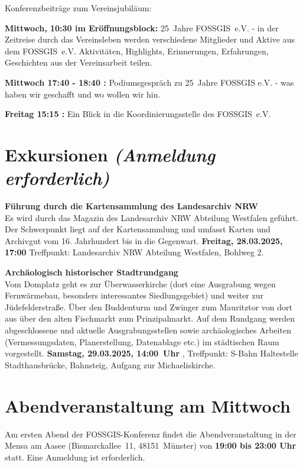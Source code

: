 \noindent
Konferenzbeiträge zum Vereinsjubiläum:
\begin{description}
\item{\bfseries Mittwoch, 10:30 im Eröffnungsblock:} 25~Jahre FOSSGIS~e.V. - in der Zeitreise durch das Vereinsleben werden verschiedene Mitglieder und Aktive aus dem FOSSGIS~e.V. Aktivitäten, Highlights, Erinnerungen, Erfahrungen, Geschichten aus der Vereinsarbeit teilen.
\item{\bfseries Mittwoch 17:40 - 18:40 \HSeins:} Podiumsgespräch zu 25~Jahre FOSSGIS e.V. - was haben wir geschafft und wo wollen wir hin.
\item{\bfseries Freitag 15:15 \HSeins:} Ein Blick in die Koordinierungsstelle des FOSSGIS~e.V.
\end{description}

\section*{Exkursionen {\normalfont\em (Anmeldung erforderlich)}}\label{exkursionen}
\noindent
{\large \bfseries Führung durch die Kartensammlung des Landesarchiv NRW}\\
Es wird durch das Magazin des Landesarchiv NRW Abteilung Westfalen geführt. Der Schwerpunkt liegt auf der Kartensammlung und umfasst Karten und Archivgut vom 16. Jahrhundert bis in die Gegenwart. {\bfseries Freitag, 28.03.2025, 17:00} Treffpunkt: Landesarchiv NRW Abteilung Westfalen, Bohlweg 2.
\bigskip

\noindent
{\large \bfseries Archäologisch historischer Stadtrundgang}\\
Vom Domplatz geht es zur Überwasserkirche (dort eine Ausgrabung wegen Fernwärmebau, besonders interessantes Siedlungsgebiet) und weiter zur Jüdefelderstraße. Über den Buddenturm und Zwinger zum Mauritztor von dort aus über den alten Fischmarkt zum Prinzipalmarkt. Auf dem Rundgang werden abgeschlossene und aktuelle Ausgrabungsstellen sowie archäologisches Arbeiten (Vermessungsdaten, Planerstellung, Datenablage etc.) im städtischen Raum vorgestellt. {\bfseries Samstag, 29.03.2025, 14:00~Uhr }, Treffpunkt: S-Bahn Haltestelle Stadthausbrücke, Bahnsteig, Aufgang zur Michaeliskirche.

\newpage
\section*{Abendveranstaltung am Mittwoch}\label{schwaetzli}
Am ersten Abend der FOSSGIS-Konferenz findet die Abendveranstaltung in der Mensa am Aasee (Bismarckallee~11, 48151~Münster) von {\bfseries 19:00 bis 23:00 Uhr} statt. Eine Anmeldung ist erforderlich.

